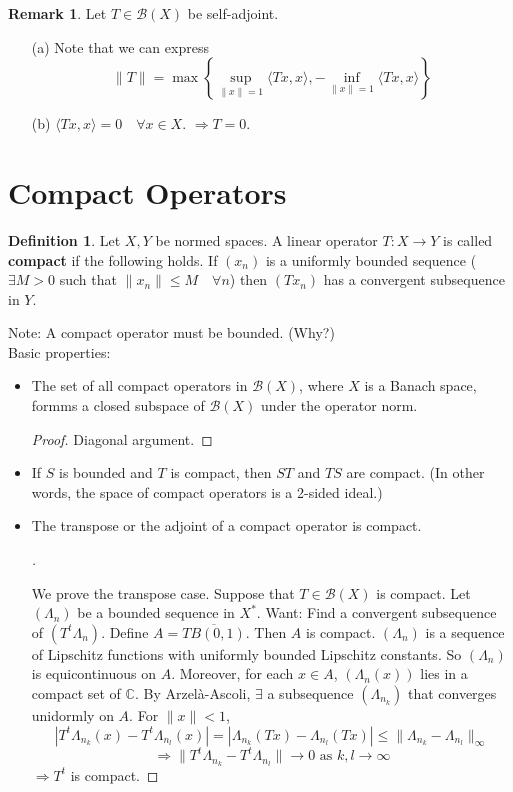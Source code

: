 \documentclass{article}
\theoremstyle{definition}
\newtheorem{dfn}{Definition}
\newtheorem{rem}{Remark}
\newenvironment{proofs}[1][\proofname]{%
  \begin{proof}[#1]$ $\par\nobreak\ignorespaces
}{%
  \end{proof}
}
\newcommand{\B}{\mathcal B}
\newcommand{\CC}{\mathbb C}
\begin{document}
\begin{rem}
	Let $T \in \B(X)$ be self-adjoint.
	\begin{enumerate}
		\item[(a)] Note that we can express
			\[
				\|T\| = \max \left\{ \sup_{\|x\| = 1} \langle T x, x \rangle, - \inf_{\|x\| = 1} \langle T x, x \rangle \right\}
			\]
			
		\item[(b)] $\langle T x, x \rangle = 0 \quad \forall x \in X$.
			$\Rightarrow T = 0$.

	\end{enumerate}
\end{rem}

\section{Compact Operators}

\begin{dfn}
	Let $X, Y$ be normed spaces.
	A linear operator $T: X \to Y$ is called \textbf{compact} if the following holds.
	If $(x_n)$ is a uniformly bounded sequence ($\exists M > 0$ such that $\|x_n\| \leq M \quad \forall n$) then $(T x_n)$ has a convergent subsequence in $Y$.
\end{dfn}

Note: A compact operator must be bounded. (Why?)\\
Basic properties:
\begin{itemize}
	\item The set of all compact operators in $\B(X)$, where $X$ is a Banach space, formms a closed subspace of $\B(X)$ under the operator norm.
		\begin{proof}
			Diagonal argument.
		\end{proof}

	\item If $S$ is bounded and $T$ is compact, then $ST$ and $TS$ are compact.
		(In other words, the space of compact operators is a 2-sided ideal.)

	\item The transpose or the adjoint of a compact operator is compact.
		\begin{proofs}
			We prove the transpose case.
			Suppose that $T \in \B(X)$ is compact.
			Let $(\Lambda_n)$ be a bounded sequence in $X^*$.
			Want: Find a convergent subsequence of $(T^t \Lambda_n)$.
			Define $A = \overline{T B(0, 1)}$.
			Then $A$ is compact.
			$(\Lambda_n)$ is a sequence of Lipschitz functions with uniformly bounded Lipschitz constants.
			So $(\Lambda_n)$ is equicontinuous on $A$.
			Moreover, for each $x \in A$, $(\Lambda_n(x))$ lies in a compact set of $\CC$.
			By Arzel\`a-Ascoli, $\exists$ a subsequence $(\Lambda_{n_k})$ that converges unidormly on $A$.
			For $\|x\| < 1$, 
			\[
				| T^t \Lambda_{n_k} (x) - T^t \Lambda_{n_l}(x)| = |\Lambda_{n_k} (T x) - \Lambda_{n_l} (T x)| \leq \|\Lambda_{n_k} - \Lambda_{n_l}\|_\infty
			\]
			\[
				\Rightarrow \|T^t \Lambda_{n_k} - T^t \Lambda_{n_l}\| \to 0 \text{ as }k, l \to \infty
			\]
			$\Rightarrow T^t$ is compact.
		\end{proofs}
\end{itemize}
\end{document}
